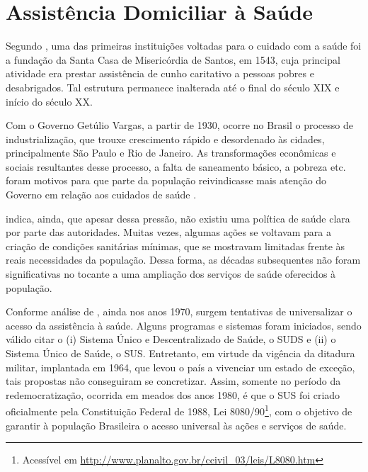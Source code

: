 \section{Assistência Domiciliar à Saúde} \label{sec:ads}

Segundo , uma das primeiras instituições voltadas para o
cuidado com a saúde foi a fundação da Santa Casa de Misericórdia de Santos, em
1543, cuja principal atividade era prestar assistência de cunho caritativo a
pessoas pobres e desabrigados. Tal estrutura permanece inalterada até o final do
século XIX e início do século XX.

Com o Governo Getúlio Vargas, a partir de 1930, ocorre no Brasil o processo de
industrialização, que trouxe crescimento rápido e desordenado às cidades,
principalmente São Paulo e Rio de Janeiro. As transformações econômicas e
sociais resultantes desse processo, a falta de saneamento básico, a pobreza etc.
foram motivos para que parte da população reivindicasse mais atenção do Governo
em relação aos cuidados de saúde \cite{carvalho1984}.

 indica, ainda, que apesar dessa pressão, não existiu
uma política de saúde clara por parte das autoridades. Muitas vezes, algumas
ações se voltavam para a criação de condições sanitárias mínimas, que se
mostravam limitadas frente às reais necessidades da população. Dessa forma, as
décadas subsequentes não foram significativas no tocante a uma ampliação dos
serviços de saúde oferecidos à população.

Conforme análise de , ainda nos anos 1970, surgem
tentativas de universalizar o acesso da assistência à saúde. Alguns programas e
sistemas foram iniciados, sendo válido citar o (i) Sistema Único e
Descentralizado de Saúde, o SUDS e (ii) o Sistema Único de Saúde, o SUS.
Entretanto, em virtude da vigência da ditadura militar, implantada em 1964, que
levou o país a vivenciar um estado de exceção, tais propostas não conseguiram se
concretizar. Assim, somente no período da redemocratização, ocorrida em meados
dos anos 1980, é que o SUS foi criado oficialmente pela Constituição Federal de
1988, Lei 8080/90\footnote{Acessível em
\url{http://www.planalto.gov.br/ccivil_03/leis/L8080.htm}}, com o  objetivo de
garantir à população Brasileira o acesso universal às ações e  serviços de
saúde.

